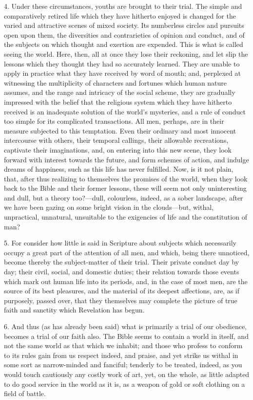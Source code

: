 4. Under these circumstances, youths are brought to their trial.
The simple and comparatively retired life which they have hitherto
enjoyed is changed for the varied and attractive scenes of mixed
society. Its numberless circles and pursuits open upon them, the
diversities and contrarieties of opinion and conduct, and of the
subjects on which thought and exertion are expended. This is what is
called seeing the world. Here, then, all at once they lose their
reckoning, and let slip the lessons which they thought they had so
accurately learned. They are unable to apply in practice what they
have received by word of mouth; and, perplexed at witnessing the
multiplicity of characters and fortunes which human nature assumes,
and the range and intricacy of the social scheme, they are gradually
impressed with the belief that the religious system which they have
hitherto received is an inadequate solution of the world's mysteries,
and a rule of conduct too simple for its complicated transactions. All
men, perhaps, are in their measure subjected to this temptation. Even
their ordinary and most innocent intercourse with others, their
temporal callings, their allowable recreations, captivate their
imaginations, and, on entering into this new scene, they look forward
with interest towards the future, and form schemes of action, and
indulge dreams of happiness, such as this life has never fulfilled.
Now, is it not plain, that, after thus realizing to themselves the
promises of the world, when they look back to the Bible and their
former lessons, these will seem not only uninteresting and dull, but a
theory too?—dull, colourless, indeed, as a sober landscape, after we
have been gazing on some bright vision in the clouds—but, withal,
unpractical, unnatural, unsuitable to the exigencies of life and the
constitution of man?

5. For consider how little is said in Scripture about subjects
which necessarily occupy a great part of the attention of all men, and
which, being there unnoticed, become thereby the subject-matter of
their trial. Their private conduct day by day; their civil, social,
and domestic duties; their relation towards those events which mark
out human life into its periods, and, in the case of most men, are the
source of its best pleasures, and the material of its deepest
affections, are, as if purposely, passed over, that they themselves
may complete the picture of true faith and sanctity which Revelation
has begun.

6. And thus (as has already been said) what is primarily a trial of
our obedience, becomes a trial of our faith also. The Bible seems to
contain a world in itself, and not the same world as that which we
inhabit; and those who profess to conform to its rules gain from us
respect indeed, and praise, and yet strike us withal in some sort as
narrow-minded and fanciful; tenderly to be treated, indeed, as you
would touch cautiously any costly work of art, yet, on the whole, as
little adapted to do good service in the world as it is, as a weapon
of gold or soft clothing on a field of battle.

